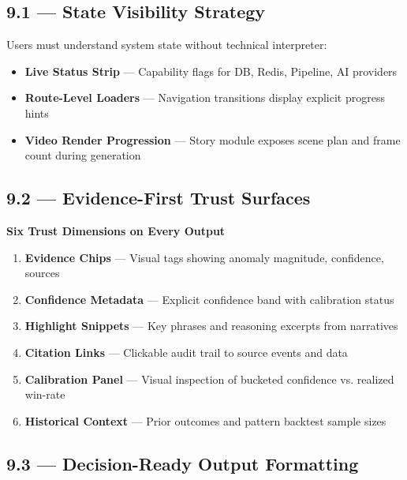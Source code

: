 \documentclass[11pt,a4paper]{article}
\begin{document}
\subsection{9.1 — State Visibility Strategy}

Users must understand system state without technical interpreter:

\begin{itemize}
    \item \textbf{Live Status Strip} — Capability flags for DB, Redis, Pipeline, AI providers
    \item \textbf{Route-Level Loaders} — Navigation transitions display explicit progress hints
    \item \textbf{Video Render Progression} — Story module exposes scene plan and frame count during generation
\end{itemize}

\subsection{9.2 — Evidence-First Trust Surfaces}

\begin{tcolorbox}[colback=mn-light, colframe=mn-success, arc=1mm, boxsep=8pt]
\small\textbf{Six Trust Dimensions on Every Output}

\begin{enumerate}[label={\color{mn-success}\textbf{\arabic1}}]
    \item \textbf{Evidence Chips} — Visual tags showing anomaly magnitude, confidence, sources
    \item \textbf{Confidence Metadata} — Explicit confidence band with calibration status
    \item \textbf{Highlight Snippets} — Key phrases and reasoning excerpts from narratives
    \item \textbf{Citation Links} — Clickable audit trail to source events and data
    \item \textbf{Calibration Panel} — Visual inspection of bucketed confidence vs. realized win-rate
    \item \textbf{Historical Context} — Prior outcomes and pattern backtest sample sizes
\end{enumerate}
\end{tcolorbox}

\subsection{9.3 — Decision-Ready Output Formatting}
\end{document}

